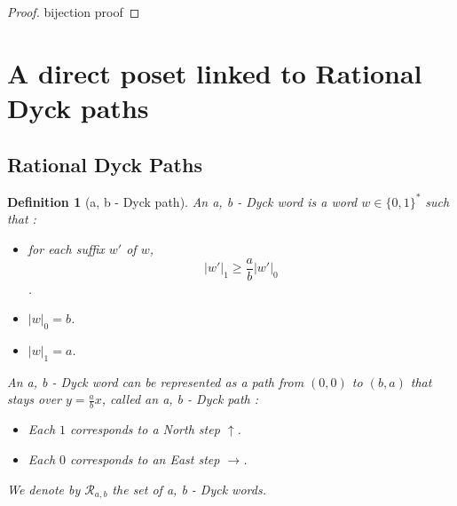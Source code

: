 \documentclass[12pt]{report}
\newtheorem{definition}{Definition}
\begin{document}
\begin{proof}
    bijection proof
\end{proof}

\section{A direct poset linked to Rational Dyck paths}

\subsection{Rational Dyck Paths}

\begin{definition}[a, b - Dyck path]
    An \emph{a, b - Dyck word} is a word $w \in \{0,1\}^*$
    such that :
    \begin{itemize}
        \item for each \emph{suffix} $w'$ of $w$,
            $$|w'|_1 \geqslant \frac{a}{b}|w'|_0$$.
        \item $|w|_0 = b$.
        \item $|w|_1 = a$.
    \end{itemize}
    An a, b - Dyck word can be represented as a 
    \emph{path} from $(0,0)$ to $(b,a)$ that stays over
    $y = \frac{a}{b}x$, called an \emph{a, b - Dyck path} :
    \begin{itemize}
        \item Each $1$ corresponds to a \emph{North step}
        $\uparrow$. 
        \item Each $0$ corresponds to an \emph{East step}
        $\rightarrow$.
    \end{itemize}
    We denote by $\mathcal{R}_{a, b}$ the set of
    a, b - Dyck words.
\end{definition}
\end{document}
